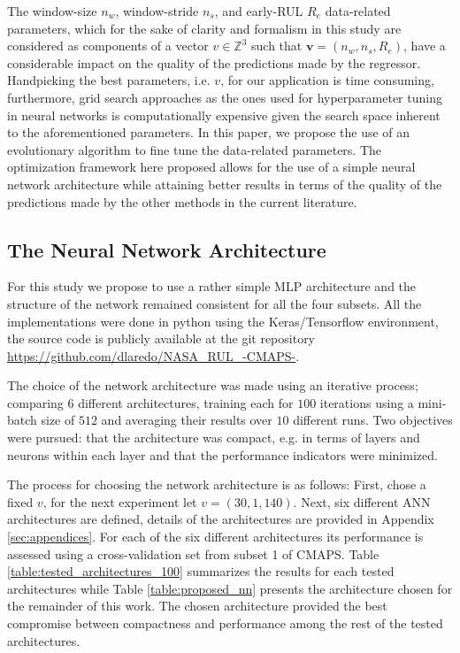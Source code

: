 \documentclass{article}
\begin{document}
The window-size $n_w$, window-stride $n_s$, and early-RUL $R_e$ data-related parameters, which for the sake of clarity and formalism in this study are considered as components of a vector $v \in \mathbb{Z}^3$ such that $\mathbf{v} = (n_w, n_s, R_e)$, have a considerable impact on the quality of the predictions made by the regressor. Handpicking the best parameters, i.e. $v$, for our application is time consuming, furthermore, grid search approaches as the ones used for hyperparameter tuning in neural networks is computationally expensive given the search space inherent to the aforementioned parameters. In this paper, we propose the use of an evolutionary algorithm to fine tune the data-related parameters. The optimization framework here proposed allows for the use of a simple neural network architecture while attaining better results in terms of the quality of the predictions made by the other methods in the current literature.

\subsection{The Neural Network Architecture}

For this study we propose to use a rather simple MLP architecture and the structure of the network remained consistent for all the four subsets. All the implementations were done in python using the Keras/Tensorflow environment, the source code is publicly available at the git repository \url{https://github.com/dlaredo/NASA_RUL_-CMAPS-}. 

The choice of the network architecture was made using an iterative process; comparing 6 different architectures, training each for $100$ iterations using a mini-batch size of $512$ and averaging their results over $10$ different runs. Two objectives were pursued: that the architecture was compact, e.g. in terms of layers and neurons within each layer and that the performance indicators were minimized. 

The process for choosing the network architecture is as follows: First, chose a fixed $v$, for the next experiment let $v= (30, 1, 140)$. Next, six different ANN architectures are defined, details of the architectures are provided in Appendix \ref{sec:appendices}. For each of the six different architectures its performance is assessed using a cross-validation set from subset 1 of CMAPS. Table \ref{table:tested_architectures_100} summarizes the results for each tested architectures while Table \ref{table:proposed_nn} presents the architecture chosen for the remainder of this work. The chosen architecture provided the best compromise between compactness and performance among the rest of the tested architectures. 
\end{document}
